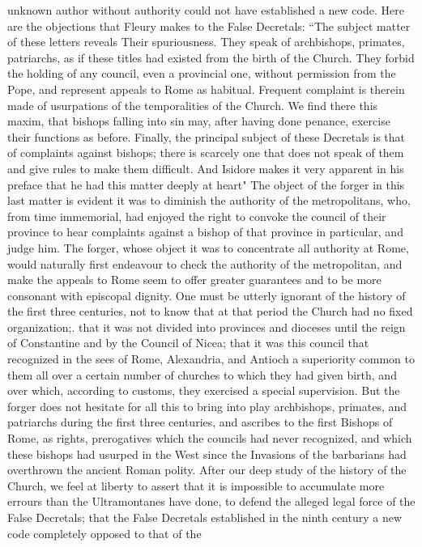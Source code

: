 unknown author without authority could not have established a new code. Here are the objections that Fleury makes to the False Decretals: “The subject matter of these letters reveals Their spuriousness. They speak of archbishops, primates, patriarchs, as if these titles had existed from the birth of the Church. They forbid the holding of any council, even a provincial one, without permission from the Pope, and represent appeals to Rome as habitual. Frequent complaint is therein made of usurpations of the temporalities of the Church. We find there this maxim, that bishops falling into sin may, after having done penance, exercise their functions as before. Finally, the principal subject of these Decretals is that of complaints against bishops; there is scarcely one that does not speak of them and give rules to make them difficult. And Isidore makes it very apparent in his preface that he had this matter deeply at heart" The object of the forger in this last matter is evident it was to diminish the authority of the metropolitans, who, from time immemorial, had enjoyed the right to convoke the council of their province to hear complaints against a bishop of that province in particular, and judge him. The forger, whose object it was to concentrate all authority at Rome, would naturally first endeavour to check the authority of the metropolitan, and make the appeals to Rome seem to offer greater guarantees and to be more consonant with episcopal dignity. One must be utterly ignorant of the history of the first three centuries, not to know that at that period the Church had no fixed organization;. that it was not divided into provinces and dioceses until the reign of Constantine and by the Council of Nicea; that it was this council that recognized in the sees of Rome, Alexandria, and Antioch a superiority common to them all over a certain number of churches to which they had given birth, and over which, according to customs, they exercised a special supervision. But the forger does not hesitate for all this to bring into play archbishops, primates, and patriarchs during the first three centuries, and ascribes to the first Bishops of Rome, as rights, prerogatives which the councils had never recognized, and which these bishops had usurped in the West since the Invasions of the barbarians had overthrown the ancient Roman polity. After our deep study of the history of the Church, we feel at liberty to assert that it is impossible to accumulate more errours than the Ultramontanes have done, to defend the alleged legal force of the False Decretals; that the False Decretals established in the ninth century a new code completely opposed to that of the

